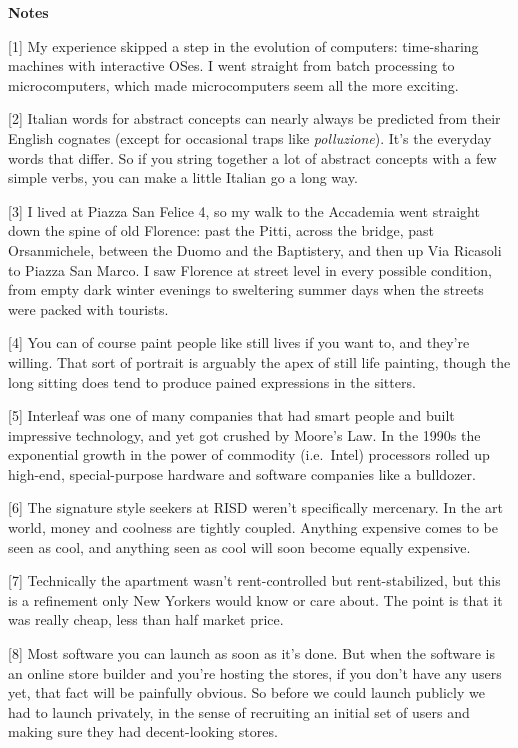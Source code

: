 \textbf{Notes}

{[}1{]} My experience skipped a step in the evolution of computers:
time-sharing machines with interactive OSes. I went straight from batch
processing to microcomputers, which made microcomputers seem all the
more exciting.

{[}2{]} Italian words for abstract concepts can nearly always be
predicted from their English cognates (except for occasional traps like
\emph{polluzione}). It's the everyday words that differ. So if you
string together a lot of abstract concepts with a few simple verbs, you
can make a little Italian go a long way.

{[}3{]} I lived at Piazza San Felice 4, so my walk to the Accademia went
straight down the spine of old Florence: past the Pitti, across the
bridge, past Orsanmichele, between the Duomo and the Baptistery, and
then up Via Ricasoli to Piazza San Marco. I saw Florence at street level
in every possible condition, from empty dark winter evenings to
sweltering summer days when the streets were packed with tourists.

{[}4{]} You can of course paint people like still lives if you want to,
and they're willing. That sort of portrait is arguably the apex of still
life painting, though the long sitting does tend to produce pained
expressions in the sitters.

{[}5{]} Interleaf was one of many companies that had smart people and
built impressive technology, and yet got crushed by Moore's Law. In the
1990s the exponential growth in the power of commodity (i.e.~Intel)
processors rolled up high-end, special-purpose hardware and software
companies like a bulldozer.

{[}6{]} The signature style seekers at RISD weren't specifically
mercenary. In the art world, money and coolness are tightly coupled.
Anything expensive comes to be seen as cool, and anything seen as cool
will soon become equally expensive.

{[}7{]} Technically the apartment wasn't rent-controlled but
rent-stabilized, but this is a refinement only New Yorkers would know or
care about. The point is that it was really cheap, less than half market
price.

{[}8{]} Most software you can launch as soon as it's done. But when the
software is an online store builder and you're hosting the stores, if
you don't have any users yet, that fact will be painfully obvious. So
before we could launch publicly we had to launch privately, in the sense
of recruiting an initial set of users and making sure they had
decent-looking stores.

